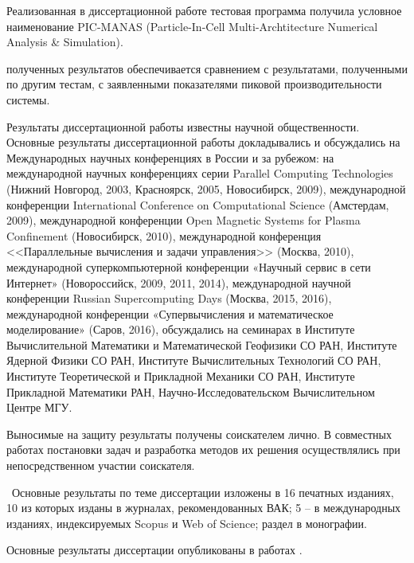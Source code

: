 Реализованная в диссертационной работе тестовая программа получила условное наименование 
PIC-MANAS (Particle-In-Cell Multi-Archtitecture Numerical Analysis \& Simulation).


{\reliability}  полученных результатов обеспечивается сравнением с результатами, полученными по другим тестам, с заявленными показателями пиковой производительности системы.


{\probation}

Результаты диссертационной работы известны научной общественности. 
Основные результаты диссертационной работы докладывались и обсуждались на Международных научных конференциях в России и за рубежом: на международной научных конференциях серии Parallel Computing Technologies (Нижний Новгород, 2003, Красноярск, 2005, Новосибирск, 2009), международной конференции International Conference on Computational Science (Амстердам, 2009),  международной конференции Open Magnetic Systems for Plasma Confinement (Новосибирск, 2010), международной конференция <<Параллельные вычисления и задачи управления>> (Москва, 2010), международной суперкомпьютерной конференции  «Научный сервис в сети Интернет» (Новороссийск, 2009, 2011, 2014), международной научной конференции Russian Supercomputing Days (Москва, 2015, 2016), международной конференции «Супервычисления и математическое моделирование» (Саров, 2016), обсуждались на семинарах в Институте Вычислительной Математики и Математической Геофизики СО РАН, Институте Ядерной Физики СО РАН, Институте Вычислительных Технологий СО РАН, Институте Теоретической и Прикладной Механики СО РАН, Институте Прикладной Математики РАН, Научно-Исследовательском Вычислительном Центре МГУ.



{\contribution} Выносимые на защиту результаты получены соискателем лично. В совместных работах постановки задач и разработка методов их решения осуществлялись при непосредственном участии соискателя.


 \publications\ Основные результаты по теме диссертации изложены в 16 печатных изданиях, 
 10 из которых изданы в журналах, рекомендованных ВАК; 5 – в
 международных изданиях, индексируемых Scopus и Web of Science; раздел в монографии.
 
 Основные результаты диссертации опубликованы в работах \cite{MohographyTarkov,NNSU,multigridAuto,AutoParSilan,VychMetPlasma,Adaptive,NSU3D,vak3multi,MatMod,vakbib2,VychMethProgExa,SuperFrI,adaptCPC,LotovPoP,integrApproach,astroCoDesign}.


